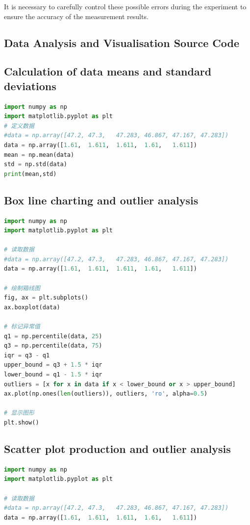 \documentclass[UTF8]{article}
\begin{document}
It is necessary to carefully control these possible errors during the experiment to ensure the accuracy of the measurement results.

\begin{appendix}
	\section{Data Analysis and Visualisation Source Code}
	\subsection{Calculation of data means and standard deviations}
	\begin{lstlisting}[language=python]
import numpy as np
import matplotlib.pyplot as plt
# 定义数据
#data = np.array([47.2,	47.3,	47.283,	46.867,	47.167,	47.283])
data = np.array([1.61,	1.611,	1.611,	1.61,	1.611])
mean = np.mean(data)
std = np.std(data)
print(mean,std)
	\end{lstlisting}
	
	\subsection{Box line charting and outlier analysis}
	\begin{lstlisting}[language=python]
import numpy as np
import matplotlib.pyplot as plt

# 读取数据
#data = np.array([47.2,	47.3,	47.283,	46.867,	47.167,	47.283])
data = np.array([1.61,	1.611,	1.611,	1.61,	1.611])

# 绘制箱线图
fig, ax = plt.subplots()
ax.boxplot(data)

# 标记异常值
q1 = np.percentile(data, 25)
q3 = np.percentile(data, 75)
iqr = q3 - q1
upper_bound = q3 + 1.5 * iqr
lower_bound = q1 - 1.5 * iqr
outliers = [x for x in data if x < lower_bound or x > upper_bound]
ax.plot(np.ones(len(outliers)), outliers, 'ro', alpha=0.5)

# 显示图形
plt.show()
		\end{lstlisting}
		
	\subsection{Scatter plot production and outlier analysis}
		\begin{lstlisting}[language=python]
import numpy as np
import matplotlib.pyplot as plt

# 读取数据
#data = np.array([47.2,	47.3,	47.283,	46.867,	47.167,	47.283])
data = np.array([1.61,	1.611,	1.611,	1.61,	1.611])


\end{lstlisting}
\end{appendix}
\end{document}
